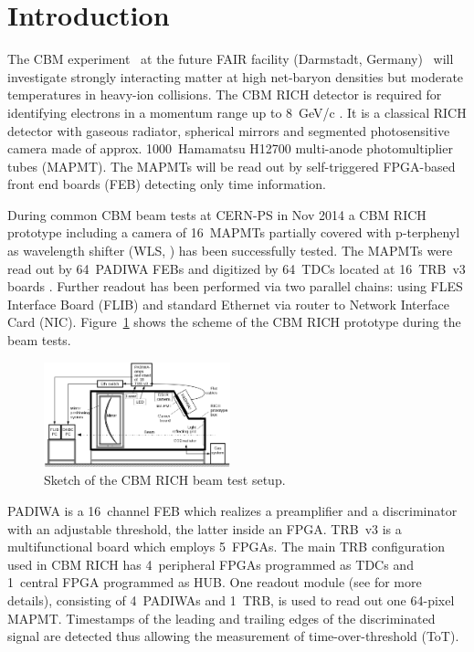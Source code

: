 \documentclass[final,5p,times,twocolumn]{elsarticle}
\begin{document}
\section{Introduction}

The CBM experiment~\cite{CBM} at the future FAIR facility (Darmstadt, Germany)~\cite{FAIR} will investigate strongly interacting matter at high net-baryon densities but moderate temperatures in heavy-ion collisions. The CBM RICH detector is required for identifying electrons in a momentum range up to 8~GeV/c \cite{CBMRICH1, CBMRICH2, CBMRICHPROJECT}. It is a classical RICH detector with gaseous radiator, spherical mirrors and segmented photosensitive camera made of approx. 1000~Hamamatsu H12700 multi-anode photomultiplier tubes (MAPMT). The MAPMTs will be read out by self-triggered FPGA-based front end boards (FEB) detecting only time information.

During common CBM beam tests at CERN-PS in Nov 2014 a CBM RICH prototype including a camera of 16~MAPMTs partially covered with p-terphenyl as wavelength shifter (WLS, \cite{WLS}) has been successfully tested. The MAPMTs were read out by 64~PADIWA FEBs and digitized by 64~TDCs located at 16~TRB~v3 boards \cite{TRB}. Further readout has been performed via two parallel chains: using FLES \cite{FLES} Interface Board (FLIB) and standard Ethernet via router to Network Interface Card (NIC). Figure~\ref{fig:BeamSetup} shows the scheme of the CBM RICH prototype during the beam tests.

\begin{figure}[tbh]
	\centering
	\includegraphics[width=0.48\textwidth]{figures/Beamtime_eng_RICH2016_poster.png}
	\caption{Sketch of the CBM RICH beam test setup.}
	\label{fig:BeamSetup}
\end{figure}

PADIWA is a 16~channel FEB which realizes a preamplifier and a discriminator with an adjustable threshold, the latter inside an FPGA. TRB~v3 is a multifunctional board which employs 5~FPGAs. The main TRB configuration used in CBM RICH has 4~peripheral FPGAs programmed as TDCs \cite{TDC} and 1~central FPGA programmed as HUB. One readout module (see \cite{PEPAN} for more details), consisting of 4~PADIWAs and 1~TRB, is used to read out one 64-pixel MAPMT. Timestamps of the leading and trailing edges of the discriminated signal are detected thus allowing the measurement of time-over-threshold (ToT).
\end{document}
